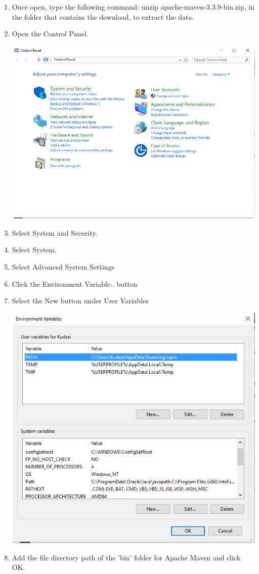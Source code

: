 \documentclass[a4paper,12pt]{article}
\begin{document}
\begin{enumerate}
\item Once open, type the following command: unzip apache-maven-3.3.9-bin.zip, in the folder that contains the download, to extract the data.
\item Open the Control Panel.

\includegraphics[width=0.9\linewidth, center]{./Installation/maven_download_4.PNG}\\[0.4cm]

\item Select System and Security.
\item Select System.
\item Select Advanced System Settings
\item Click the Environment Variable.. button
\item Select the New button under User Variables

\includegraphics[width=0.9\linewidth, center]{./Installation/maven_download_5.PNG}\\[0.4cm]

\item Add the file directory path of the 'bin' folder for Apache Maven and click OK.
\end{enumerate}
\end{document}
